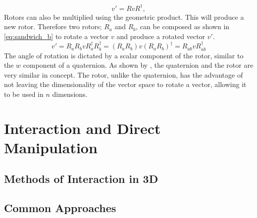\documentclass{l4proj}
\begin{document}
%
\begin{equation}
  \label{eq:sandwich_a}
    v' = R v R^\dagger,
\end{equation}
%
Rotors can also be multiplied using the geometric product. This will produce a new rotor. Therefore two rotors; $R_a$ and $R_b$, can be composed as shown in \cref{eq:sandwich_b} to rotate a vector \(v\) and produce a rotated vector \(v'\).
%
\begin{equation}
  \label{eq:sandwich_b}
  v' = R_a R_b v R_a^{\dagger} R_b^{\dagger}
   = (R_a R_b) v (R_a R_b)^{\dagger}
   = R_{ab}^{} v R_{ab}^{\dagger}
\end{equation}
%
The angle of rotation is dictated by a scalar component of the rotor, similar to the \(w\) component of a quaternion. 
As shown by \citep{bosch_code_nodate}, the quaternion and the rotor are very similar in concept. The rotor, unlike the quaternion, has the advantage of not leaving the dimensionality of the vector space to rotate a vector, allowing it to be used in \(n\) dimensions.

\section{Interaction and Direct Manipulation}
\label{background_rotation}

\subsection{Methods of Interaction in 3D}

\subsection*{Common Approaches}
\end{document}

